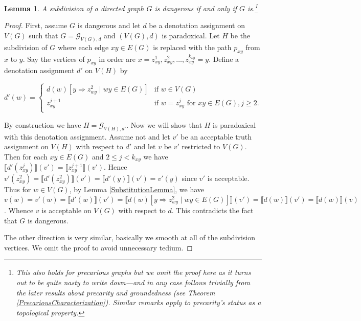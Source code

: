 \documentclass[12pt]{kluwer}
\newtheorem{lem}[thm]{Lemma}
\theoremstyle{remark}
\newcommand{\fancy}[1]{\mathcal{#1}}
\def\G{\fancy{G}}
\begin{document}
\begin{lem}\label{SubdivisionLemma}
A subdivision of a directed graph $G$ is dangerous if and only if $G$ is.\footnote{This also holds for precarious graphs but we omit the proof here as it turns out to be quite nasty to write down---and in any case follows trivially from the later results about precarity and groundedness (see Theorem \ref{PrecariousCharacterization}). Similar remarks apply to precarity's status as a topological property.}
\end{lem}
\begin{proof}
First, assume $G$ is dangerous and let $d$ be a denotation assignment on $V(G)$ such that $G = \G_{V(G), d}$ and $(V(G), d)$ is paradoxical.  Let $H$ be the subdivision of $G$ where each edge $xy \in E(G)$ is replaced with the path $p_{xy}$ from $x$ to $y$.  Say the vertices of $p_{xy}$ in order are $x = z_{xy}^1, z_{xy}^2, \ldots, z_{xy}^{k_{xy}} = y$.  Define a denotation assignment $d'$ on $V(H)$ by

\[d'(w) = \begin{cases}
d(w)[y \Rightarrow z_{wy}^2 \mid wy \in E(G)] & \text{if } w \in V(G) \\
z_{xy}^{j+1} & \text{if } w = z_{xy}^j \text{ for } xy \in E(G), j \geq 2. \\
\end{cases}\]

By construction we have $H = \G_{V(H), d'}$.  Now we will show that $H$ is paradoxical with this denotation assignment.  Assume not and let $v'$ be an acceptable truth assignment on $V(H)$ with respect to $d'$ and let $v$ be $v'$ restricted to $V(G)$. Then for each $xy \in E(G)$ and $2 \leq j < k_{xy}$ we have $\llbracket d'(z_{xy}^j) \rrbracket(v') = \llbracket z_{xy}^{j + 1} \rrbracket(v')$.  Hence $v'(z_{xy}^2) = \llbracket d'(z_{xy}^2) \rrbracket(v') = \llbracket d'(y) \rrbracket(v') = v'(y)$ since $v'$ is acceptable.  Thus for $w \in V(G)$, by Lemma \ref{SubstitutionLemma}, we have $v(w) = v'(w) = \llbracket d'(w) \rrbracket(v') = \llbracket d(w)[y \Rightarrow z_{wy}^2 \mid wy \in E(G)] \rrbracket(v') = \llbracket d(w) \rrbracket(v') = \llbracket d(w) \rrbracket(v)$.  Whence $v$ is acceptable on $V(G)$ with respect to $d$.  This contradicts the fact that $G$ is dangerous.\newline

The other direction is very similar, basically we smooth at all of the subdivision vertices.  We omit the proof to avoid unnecessary tedium.
\end{proof}
\end{document}
